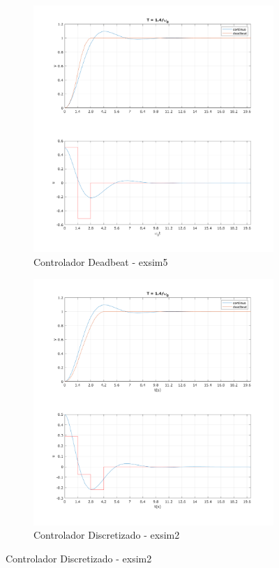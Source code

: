 \documentclass[a4paper,11pt]{article}
\begin{document}
\begin{figure}[H]
    \centering
    \begin{subfigure}[m]{0.49\linewidth}
        \centering
        \includegraphics[width=1\linewidth]{img/exsim5-deadbeat-sim.png}
        \caption{Controlador Deadbeat - exsim5}
    \end{subfigure}
    \hfill
    \begin{subfigure}[m]{0.49\linewidth}
        \centering
        \includegraphics[width=1\linewidth]{img/exsim5-exsim2-sim.png}
        \caption{Controlador Discretizado - exsim2}
    \end{subfigure}
\end{figure}
\end{document}
